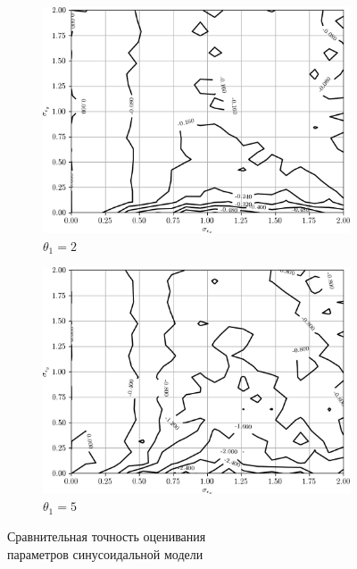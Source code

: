 \begin{figure}[p]
  \begin{subfigure}[b]{\linewidth}
    \centering
    \includegraphics[width=135mm]{fig/nonlinear/sinusoidal/a-0_b-2.png}
    \caption{\( \theta_1 = 2 \)}
  \end{subfigure}

  \vspace{2\baselineskip}
  \begin{subfigure}[b]{\linewidth}
    \centering
    \includegraphics[width=135mm]{fig/nonlinear/sinusoidal/a-0_b-10.png}
    \caption{\( \theta_1 = 5 \)}
  \end{subfigure}

  \vspace{\baselineskip}
  \caption{
    Сравнительная точность оценивания \\
    параметров синусоидальной модели
  }\label{fig:comparison_nonlinear_sinusoidal}
\end{figure}

